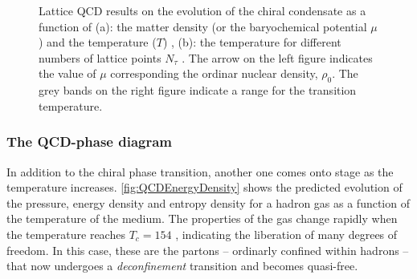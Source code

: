 \begin{figure}[h]
	\caption{Lattice QCD results on the evolution of the chiral condensate as a function of (a): the matter density (or the baryochemical potential $\mu$) and the temperature ($T$) \cite{muroyaLatticeQCDFinite2003}, (b): the temperature for different numbers of lattice points $N_{\tau}$ \cite{weiseChiralSymmetryStrongly2010}. The arrow on the left figure indicates the value of $\mu$ corresponding the ordinar nuclear density, $\rho_0$. The grey bands on the right figure indicate a range for the transition temperature.}
	\label{fig:ChiralTransition}
\end{figure}

\subsubsection{The QCD-phase diagram}
\label{subsubsec:QCDphasediagram}

In addition to the chiral phase transition, another one comes onto stage as the temperature increases. \Fig\ref{fig:QCDEnergyDensity} shows the predicted evolution of the pressure, energy density and entropy density for a hadron gas as a function of the temperature of the medium. The properties of the gas change rapidly when the temperature reaches $T_{c} = 154$ \mev, indicating the liberation of many degrees of freedom. In this case, these are the partons -- ordinarly confined within hadrons -- that now undergoes a \textit{deconfinement} transition and becomes quasi-free. 


